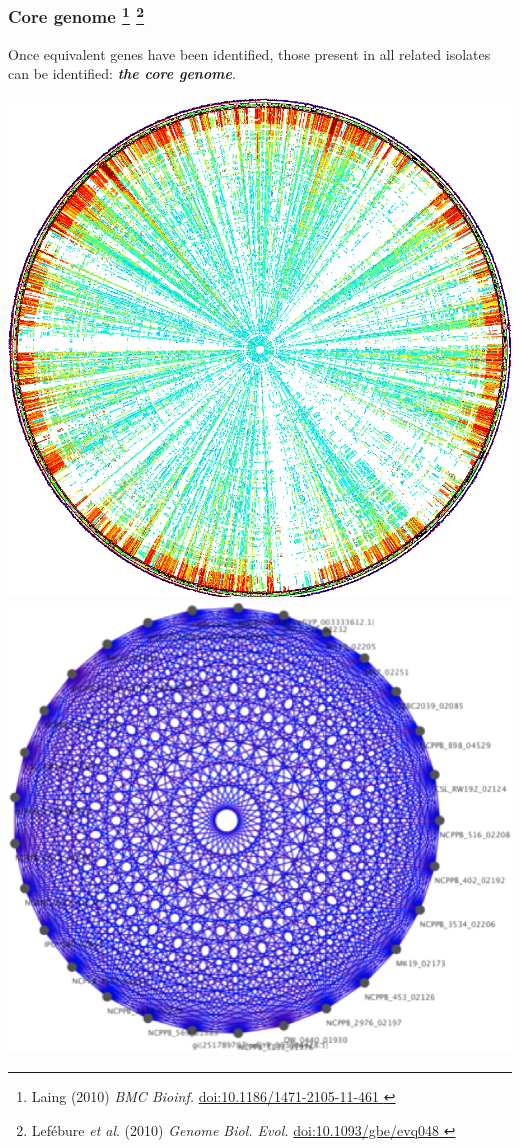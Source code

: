 \begin{frame}
  \frametitle{Core genome   
  \footnote{\tiny{Laing (2010) \textit{BMC Bioinf.} \href{http://dx.doi.org/10.1186/1471-2105-11-461}{doi:10.1186/1471-2105-11-461
  }}}
    \footnote{\tiny{Lef\'{e}bure \textit{et al}. (2010) \textit{Genome Biol. Evol.} \href{http://dx.doi.org/10.1371/10.1093/gbe/evq048}{doi:10.1093/gbe/evq048
    }}}  
}
  \textcolor{hutton_green}{Once equivalent genes have been identified, those present in all related isolates can be identified: \textbf{\textit{the core genome}}.}\\
  \begin{center}
      \includegraphics[height=0.5\textheight]{images/pba_400_circular}
      \includegraphics[height=0.5\textheight]{images/core_cluster}      
  \end{center}
\end{frame}

